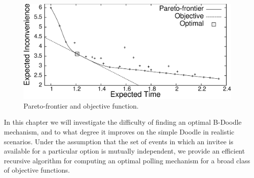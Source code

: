 \begin{figure}[h!] \small
\centering
\includegraphics[scale=0.48]{plots/pareto_objective_fin.eps}
\caption{Pareto-frontier and objective function.}
\label{bdoodle:fig:Pareto_objective}
\end{figure}

In this chapter we will investigate the difficulty of finding an optimal B-Doodle mechanism, and to what degree it improves on the simple Doodle in realistic scenarios.
Under the assumption that the set of events in which an invitee is available for a particular option is mutually independent, 
we provide an efficient recursive algorithm for computing an optimal polling mechanism for a broad class of objective functions.

